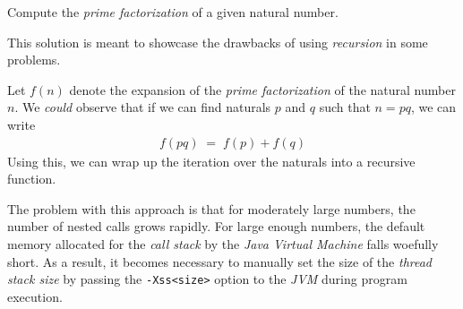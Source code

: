 

\problem Compute the \textit{prime factorization} of a given natural number.

\solution
This solution is meant to showcase the drawbacks of using \textit{recursion} in some problems.
\par
Let $f(n)$ denote the expansion of the \textit{prime factorization} of the natural number $n$. We \textit{could} observe
that if we can find naturals $p$ and $q$ such that $n = pq$, we can write
\begin{align*}
	f(pq) \;=\; f(p) + f(q)
\end{align*}
Using this, we can wrap up the iteration over the naturals into a recursive function.
\par
The problem with this approach is that for moderately large numbers, the number of nested calls grows rapidly.
For large enough numbers, the default memory allocated for the \textit{call stack} by the \textit{Java Virtual Machine} falls woefully short.
As a result, it becomes necessary to manually set the size of the \textit{thread stack size} by passing the \texttt{-Xss<size>} option
to the \textit{JVM} during program execution. 

